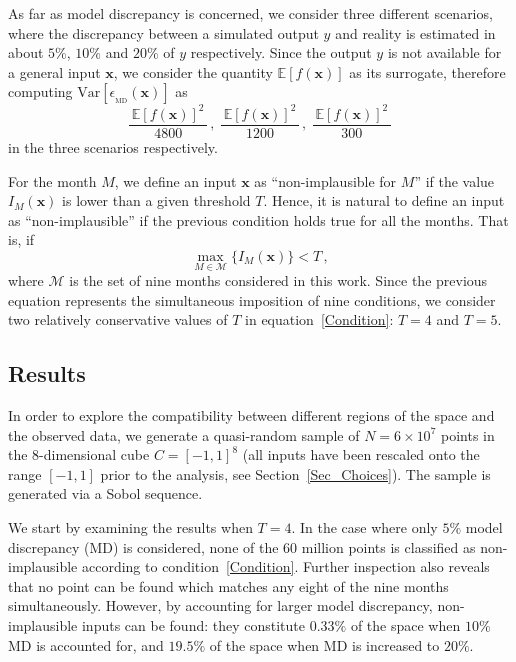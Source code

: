\documentclass[a4paper, 12pt]{article}
\newcommand{\bd}[1]{\boldsymbol{#1}}
\newcommand{\x}{\bd x}
\newcommand{\E}{\mathbb{E}}
\newcommand{\Var}{\text{Var}}
\begin{document}
As far as model discrepancy is concerned, we consider three different scenarios, where the discrepancy between a simulated output $y$ and reality is estimated in about $5\%$, $10\%$ and $20\%$ of $y$ respectively. Since the output $y$ is not available for a general input $\x$, we consider the quantity $\E[f(\x)]$ as its surrogate, therefore computing $\Var[\epsilon_{_\text{MD}}(\x)]$
as
\begin{equation}
\frac{ \,{\E[f(\x)]}^2\, }{4800}\,, \;
\frac{ \,{\E[f(\x)]}^2\, }{1200}\,, \;
\frac{ \,{\E[f(\x)]}^2\, }{300}
\end{equation}
in the three scenarios respectively.



For the month $M$, we define an input $\x$ as ``non-implausible for $M$'' if the value $I_M(\x)$ is lower than a given threshold $T$. Hence, it is natural to define an input as ``non-implausible'' if the previous condition holds true for all the months. That is, if
\begin{equation}\label{Condition}
\max_{M \in \mathcal{M}} \big\{ I_M(\x) \big\} < T\,,
\end{equation}
where $\mathcal{M}$ is the set of nine months considered in this work. Since the previous equation represents the simultaneous imposition of nine conditions, we consider two relatively conservative values of $T$ in equation~\eqref{Condition}: $T=4$ and $T=5$. 

\subsection{Results}
In order to explore the compatibility between different regions of the space and the observed data, we generate a quasi-random sample of $N = 6 \times 10^7$ points in the 8-dimensional cube $C={[-1,1]}^8$ (all inputs have been rescaled onto the range $[-1,1]$ prior to the analysis, see Section~\ref{Sec_Choices}). The sample is generated via a Sobol sequence.


We start by examining the results when $T=4$.
In the case where only $5\%$ model discrepancy (MD) is considered, none of the 60 million points is classified as non-implausible according to condition~\eqref{Condition}. Further inspection also reveals that no point can be found which matches any eight of the nine months simultaneously.
However, by accounting for larger model discrepancy, non-implausible inputs can be found: they constitute $0.33\%$ of the space when $10\%$ MD is accounted for, and $19.5\%$ of the space when MD is increased to $20\%$.
\end{document}
